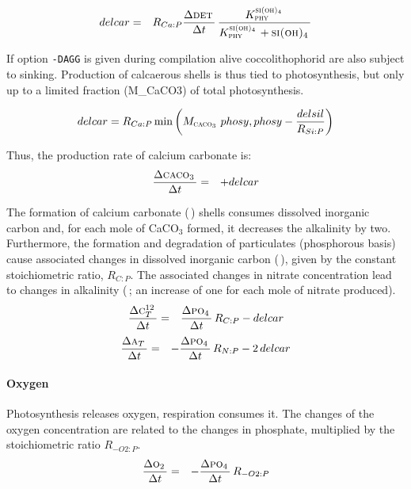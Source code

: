 \documentclass[11pt,a4paper,fleqn,twoside]{article}
\def\pho{\text{\textsc{po$_4$}}\,}
\def\car{\text{\textsc{c$_T^{12}$}}\,}
\def\oxy{\text{\textsc{o$_2$}}\,}
\def\alk{\text{\textsc{a$_T$}}\,}
\def\sio{\text{\textsc{si(oh)$_4$}}\,}
\def\phy{\text{\textsc{phy}}\,}
\def\det{\text{\textsc{det}}\,}
\def\cal{\text{\textsc{caco$_3$}}\,}
\begin{document}
\begin{eqnarray}
\label{eq_delcarnoagg}
delcar & = & R_{Ca:P} \frac{\Delta \det}{\Delta t}\,\frac{K_{\phy}^{\sio}}
{K_{\phy}^{\sio}+\sio} 
\end{eqnarray}

If option {\tt -DAGG} is given during compilation alive coccolithophorid
are also subject to sinking.  Production of calcaerous shells is thus 
tied to photosynthesis, but
only up  to a limited fraction (M\_{CaCO3}) of total photosynthesis.


\begin{equation}
\label{eq_delcaragg}
delcar = R_{Ca:P} \min\left(M_\cal \, phosy, phosy-\frac{delsil}{R_{Si:P}} \right)
\end{equation}

Thus, the production rate of calcium carbonate is:
\begin{eqnarray}
\label{eq_cal_sur}
\frac{\Delta \cal}{\Delta t} & = & + delcar
\end{eqnarray}


The formation of calcium carbonate (\cal) shells 
consumes dissolved inorganic carbon and, for each mole of CaCO$_3$ formed,
it decreases the alkalinity by two. Furthermore, the
formation and degradation of particulates (phosphorous basis) cause 
associated changes in dissolved inorganic carbon (\car), given by the constant
stoichiometric ratio, $R_{C:P}$. The associated changes in nitrate
concentration lead to changes in alkalinity (\alk; an increase of one for each
mole of nitrate produced). 
\begin{eqnarray}
\label{eq_car_sur}
\frac{\Delta \car}{\Delta t} & = & \frac{\Delta \pho}{\Delta t} \, R_{C:P} - delcar
\end{eqnarray}
\begin{eqnarray}
\label{eq_alk_sur}
\frac{\Delta \alk}{\Delta t} & = & - \frac{\Delta \pho}{\Delta t}\, R_{N:P} - 2 \, delcar  
\end{eqnarray}

\paragraph{Oxygen} Photosynthesis releases oxygen, respiration consumes it. The
changes of the oxygen concentration are related to the changes in phosphate, multiplied by the
stoichiometric ratio $R_{-O2:P}$.
\begin{eqnarray}
\label{eq_oxy_sur}
\frac{\Delta \oxy}{\Delta t} & = & - \frac{\Delta \pho}{\Delta t} \, R_{-O2:P} 
\end{eqnarray}
\end{document}

